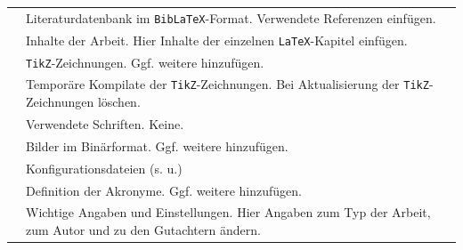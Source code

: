 \begin{longtable}{l@{\extracolsep{8pt}}x}
                   & Literaturdatenbank im \texttt{BibLaTeX}-Format. Verwendete Referenzen einfügen.\\
                      & Inhalte der Arbeit. Hier Inhalte der einzelnen \texttt{LaTeX}-Kapitel einfügen.\\
                  & \texttt{TikZ}-Zeichnungen. %
                                                 Ggf. weitere hinzufügen.\\
             & Temporäre Kompilate der \texttt{TikZ}-Zeichnungen.
                                                 Bei Aktualisierung der \texttt{TikZ}-Zeichnungen löschen.\\
                        & Verwendete Schriften. Keine.\\
                       & Bilder im Binärformat. %
                                                 Ggf. weitere hinzufügen. \\
                     & Konfigurationsdateien (s. u.)\\
          & Definition der Akronyme.
                                                 Ggf. weitere hinzufügen.\\
       & Wichtige Angaben und Einstellungen.
                                                 Hier Angaben zum Typ der Arbeit, zum Autor und zu den Gutachtern ändern.\\

\end{longtable}
